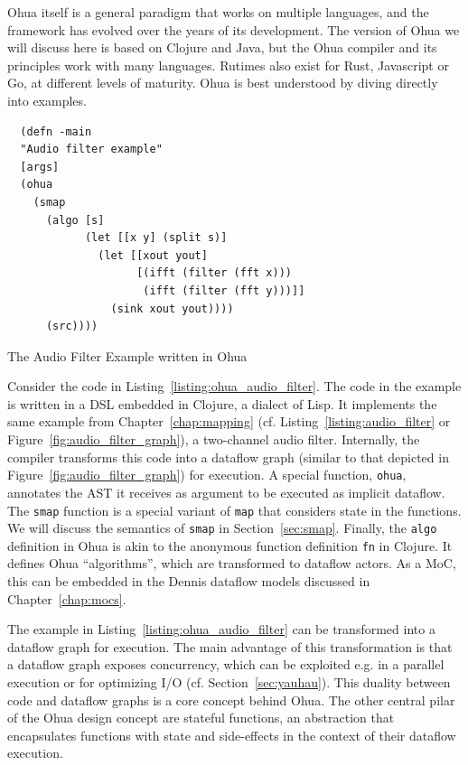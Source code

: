 Ohua itself is a general paradigm that works on multiple languages, and the framework has evolved over the years of its development.
The version of Ohua we will discuss here is based on Clojure and Java, but the Ohua compiler and its principles work with many languages.
Rutimes also exist for Rust, Javascript or Go, at different levels of maturity.
Ohua is best understood by diving directly into examples. 

\begin{listing}
\begin{verbatim}
  (defn -main
  "Audio filter example"
  [args]
  (ohua
    (smap
      (algo [s]
            (let [[x y] (split s)]
              (let [[xout yout]
                    [(ifft (filter (fft x)))
                     (ifft (filter (fft y)))]]
                (sink xout yout))))
      (src))))
\end{verbatim}
\caption{The Audio Filter Example written in Ohua}
\label{listing:ohua_audio_filter}
\end{listing}

Consider the code in Listing~\ref{listing:ohua_audio_filter}. The code in the example is written in a \ac{DSL} embedded in Clojure, a dialect of Lisp.
It implements the same example from Chapter~\ref{chap:mapping} (cf. Listing~\ref{listing:audio_filter} or Figure~\ref{fig:audio_filter_graph}), a two-channel audio filter.
Internally, the compiler transforms this code into a dataflow graph (similar to that depicted in Figure~\ref{fig:audio_filter_graph}) for execution.
A special function, \texttt{ohua}, annotates the \ac{AST} it receives as argument to be executed as implicit dataflow.
The \texttt{smap} function is a special variant of \texttt{map} that considers state in the functions.
We will discuss the semantics of \texttt{smap} in Section~\ref{sec:smap}.
Finally, the \texttt{algo} definition in Ohua is akin to the anonymous function definition \texttt{fn} in Clojure.
It defines Ohua ``algorithms'', which are transformed to dataflow actors.
As a \ac{MoC}, this can be embedded in the Dennis dataflow models discussed in Chapter~\ref{chap:mocs}.

The example in Listing~\ref{listing:ohua_audio_filter} can be transformed into a dataflow graph for execution.%
The main advantage of this transformation is that a dataflow graph exposes concurrency, which can be exploited e.g. in a parallel execution or for optimizing \ac{I/O} (cf. Section~\ref{sec:yauhau}).
This duality between code and dataflow graphs is a core concept behind Ohua.
The other central pilar of the Ohua design concept are stateful functions, an abstraction that encapsulates functions with state and side-effects in the context of their dataflow execution.

